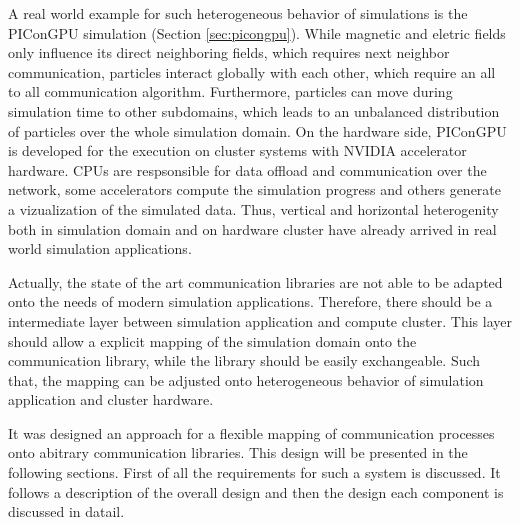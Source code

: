 
  A real world example for such heterogeneous behavior of simulations
  is the PIConGPU simulation (Section \ref{sec:picongpu}). While
  magnetic and eletric fields only influence its direct neighboring
  fields, which requires next neighbor communication, particles
  interact globally with each other, which require an all to all
  communication algorithm. Furthermore, particles can move during
  simulation time to other subdomains, which leads to an unbalanced
  distribution of particles over the whole simulation domain. On the
  hardware side, PIConGPU is developed for the execution on cluster
  systems with NVIDIA accelerator hardware.  CPUs are respsonsible for
  data offload and communication over the network, some accelerators
  compute the simulation progress and others generate a vizualization
  of the simulated data. Thus, vertical and horizontal heterogenity
  both in simulation domain and on hardware cluster have already
  arrived in real world simulation applications.

  Actually, the state of the art communication libraries are not able to
  be adapted onto the needs of modern simulation applications.
  Therefore, there should be a intermediate layer between simulation
  application and compute cluster. This layer should allow a explicit
  mapping of the simulation domain onto the communication library,
  while the library should be easily exchangeable. Such that, the
  mapping can be adjusted onto heterogeneous behavior of simulation
  application and cluster hardware.


  It was designed an approach for a flexible mapping of communication
  processes onto abitrary communication libraries. This design will
  be presented in the following sections. First of all the
  requirements for such a system is discussed. It follows a
  description of the overall design and then the design each component
  is discussed in datail.


